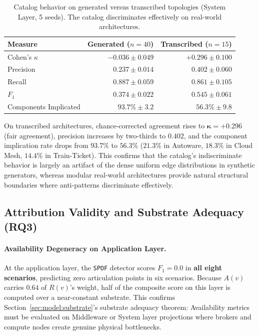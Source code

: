 \begin{table}[htbp]
\centering
\footnotesize
\setlength{\tabcolsep}{4pt}
\caption{Catalog behavior on generated versus transcribed topologies (System Layer, 5 seeds). The catalog discriminates effectively on real-world architectures.}
\label{tab:realworld}
\begin{tabular}{lrr}
\toprule
\textbf{Measure} & \textbf{Generated} ($n=40$) & \textbf{Transcribed} ($n=15$) \\
\midrule
Cohen's $\kappa$          & $-0.036 \pm 0.049$ & $\mathbf{+0.296 \pm 0.100}$ \\
Precision                 & $0.237 \pm 0.014$  & $\mathbf{0.402 \pm 0.060}$ \\
Recall                    & $0.887 \pm 0.059$  & $0.861 \pm 0.105$ \\
$F_1$                     & $0.374 \pm 0.022$  & $\mathbf{0.545 \pm 0.061}$ \\
Components Implicated     & $93.7\% \pm 3.2$   & $\mathbf{56.3\% \pm 9.8}$ \\
\bottomrule
\end{tabular}
\end{table}

On transcribed architectures, chance-corrected agreement rises to $\mathbf{\kappa = +0.296}$ (fair agreement), precision increases by two-thirds to $0.402$, and the component implication rate drops from $93.7\%$ to $56.3\%$ ($21.3\%$ in Autoware, $18.3\%$ in Cloud Mesh, $14.4\%$ in Train-Ticket). This confirms that the catalog's indiscriminate behavior is largely an artifact of the dense uniform edge distributions in synthetic generators, whereas modular real-world architectures provide natural structural boundaries where anti-patterns discriminate effectively.

\subsection{Attribution Validity and Substrate Adequacy (RQ3)}
\label{sec:results:attribution}

\paragraph{Availability Degeneracy on Application Layer.}
At the application layer, the \texttt{SPOF} detector scores $F_1 = 0.0$ in \textbf{all eight scenarios}, predicting zero articulation points in six scenarios. Because $A(v)$ carries $0.64$ of $R(v)$'s weight, half of the composite score on this layer is computed over a near-constant substrate. This confirms Section~\ref{sec:model:substrate}'s substrate adequacy theorem: Availability metrics must be evaluated on Middleware or System layer projections where brokers and compute nodes create genuine physical bottlenecks.

